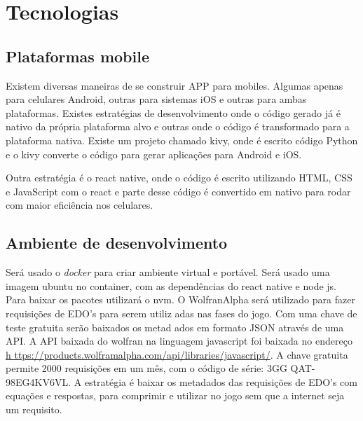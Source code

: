 \chapter[Tecnologias]{Tecnologias}

\section[Plataformas mobile]{Plataformas mobile}
Existem diversas maneiras de se construir APP para mobiles. Algumas apenas para celulares Android, outras para sistemas iOS e outras para ambas plataformas. Existes estratégias de desenvolvimento onde o código gerado já é nativo da própria plataforma alvo e outras onde o código é transformado para a plataforma nativa.
Existe um  projeto chamado kivy, onde é escrito código Python e o kivy converte o código para gerar aplicações para Android e iOS.

Outra estratégia é o react native, onde o código é escrito utilizando HTML, CSS e JavaScript com o react e parte desse código é convertido em nativo para rodar com maior eficiência nos celulares.

\section[Ambiente de desenvolvimento]{Ambiente de desenvolvimento}

Será usado o \textit{docker} para criar ambiente virtual e portável.
Será usado uma imagem ubuntu no container, com as dependências do react native     e node js. Para baixar os pacotes utilizará o nvm. 
O WolfranAlpha será utilizado para fazer requisições de EDO's para serem utiliz    adas nas fases do jogo. Com uma chave de teste gratuita serão baixados os metad    ados em formato JSON através de uma API.
A API baixada do wolfran na linguagem javascript foi baixada no endereço \url{h    ttps://products.wolframalpha.com/api/libraries/javascript/}.
A chave gratuita permite 2000 requisições em um mês, com o código de série: 3GG    QAT-98EG4KV6VL. A estratégia é baixar os metadados das requisições de EDO's com     equações e respostas, para comprimir e utilizar no jogo sem que a internet seja um requisito.
